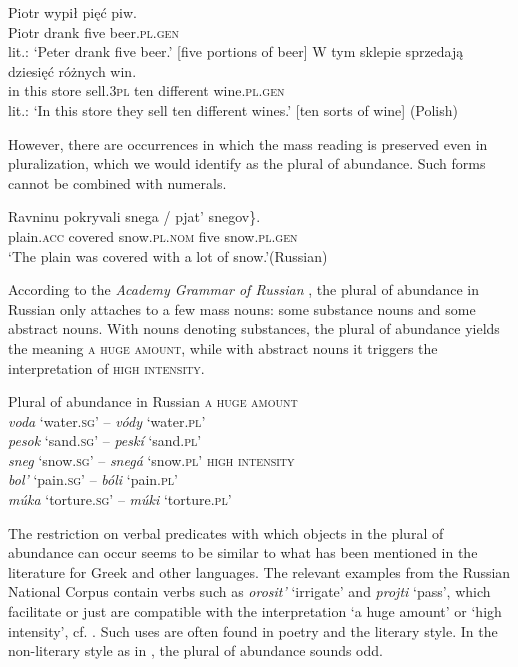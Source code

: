\documentclass[output=paper,colorlinks,citecolor=brown]{langscibook}
\begin{document}
\ea\label{ex:geist:39}
\ea\gll Piotr wypił pięć piw. \\
Piotr drank five beer.\textsc{pl.gen} \\ 
\glt lit.: `Peter drank five beer.' [five portions of beer]
\label{ex:geist:39a}
\ex\gll W tym sklepie sprzedają dziesięć różnych win. \\
in this store sell.\textsc{3pl} ten different wine.\textsc{pl.gen} \\
\glt lit.: `In this store they sell ten different wines.' [ten sorts of wine] 
\label{ex:geist:39b}
\z\hfill (Polish)\z
   			
\noindent However, there are occurrences in which the mass reading is preserved even in pluralization, which we would identify as the plural of abundance. Such forms cannot be combined with numerals. 

\ea\gll Ravninu \minsp{\{} pokryvali snega / \minsp{*} pjat' snegov\}. \\
plain.\textsc{acc} {} covered snow.\textsc{pl.nom} {} {} five snow.\textsc{pl.gen} \\  
\glt `The plain was covered with a lot of snow.'\hfill (Russian)
\z

\noindent According to the \textit{Academy Grammar of Russian} \citep{geist:Svedova1980}, the plural of abundance in Russian only attaches to a few mass nouns: some substance nouns and some abstract nouns. With nouns denoting substances, the plural of abundance yields the meaning \textsc{a huge amount}, while with abstract nouns it triggers the interpretation of \textsc{high intensity}.

\ea\label{ex:geist:41}
Plural of abundance in Russian \citep[473]{geist:Svedova1980} 
\ea \textsc{a huge amount}\\\textit{voda} `water.\textsc{sg}' -- \textit{vódy} `water.\textsc{pl}'\\ \textit{pesok} `sand.\textsc{sg}' -- \textit{peskí} `sand.\textsc{pl}'\\ 	\textit{sneg} `snow.\textsc{sg}' -- \textit{snegá} `snow.\textsc{pl}' 
\ex \textsc{high intensity}\\  \textit{bol'} `pain.\textsc{sg}' -- \textit{bóli} `pain.\textsc{pl}'\\ \textit{múka} `torture.\textsc{sg}' -- \textit{múki} `torture.\textsc{pl}'
\z\z
	
\noindent The restriction on verbal predicates with which objects in the plural of abundance can occur seems to be similar to what has been mentioned in the literature for Greek and other languages. The relevant examples from the Russian National Corpus contain verbs such as \textit{orosit'} `irrigate' and \textit{projti} `pass', which facilitate or just are compatible with the interpretation `a huge amount' or `high intensity', cf. . Such uses are often found in poetry and the literary style. In the non-literary style as in , the plural of abundance sounds odd.
\end{document}
